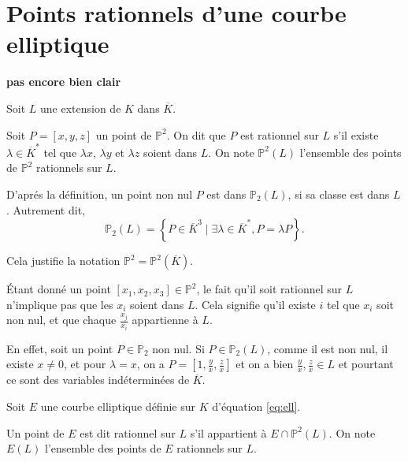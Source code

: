 \begin{remarque}
\end{remarque}


\section{Points rationnels d'une courbe elliptique}
\textbf{pas encore bien clair}

Soit $L$ une extension de $K$ dans $\overline{K}$.

\begin{definition}
    Soit $P=\left[ x,y,z \right] $ un point de $\mathbb{P}^2$. On dit que $P$ est rationnel sur $L$ s'il existe $\lambda \in \overline{K}^{*}$ tel que $\lambda x$, $\lambda y$ et $\lambda z$ soient dans $L$. On note $\mathbb{P}^2(L)$ l'ensemble des points de $\mathbb{P}^2$ rationnels sur $L$.

\end{definition}

D'aprés la définition, un point non nul $P$ est dans $\mathbb{P}_{2}(L)$, si sa classe est dans $L$. Autrement
dit, 
\[
\mathbb{P}_{2}(L)=\left\{ P \in \overline{K}^{3} \mid \exists \lambda \in \overline{K}^{*}, P =
\lambda P\right\} 
.\] 

Cela justifie la notation $\mathbb{P}^2 = \mathbb{P}^2(\overline{K})$.

\begin{remarque}
    Étant donné un point $[x_1,x_2,x_3] \in \mathbb{P}^2$, le fait qu'il soit rationnel sur $L$ n'implique pas que les $x_{i}$ soient dans $L$. Cela signifie qu'il existe $i$ tel que $x_{i}$ soit non nul, et que chaque $\frac{x_{j}}{x_{i}}$ appartienne à $L$.

    En effet, soit un point $P \in \mathbb{P}_{2}$ non nul. Si $P \in \mathbb{P}_{2}(L)$,
    comme il est non nul, il existe $x \neq 0$, et pour $\lambda = x$, on a $P =
    [1,\frac{y}{x},\frac{z}{x}]$ et on a bien $\frac{y}{x},\frac{z}{x} \in L$ et pourtant ce
    sont des variables indéterminées de $\overline{K}$.
\end{remarque}

Soit $E$ une courbe elliptique définie sur $K$ d'équation \eqref{eq:ell}.

\begin{definition}
    Un point de $E$ est dit rationnel sur $L$ s'il appartient à $E \cap \mathbb{P}^2(L)$. On note $E(L)$ l'ensemble des points de $E$ rationnels sur $L$.
\end{definition}


